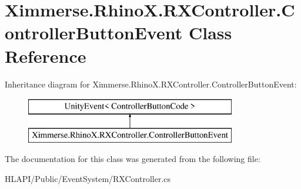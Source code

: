 \hypertarget{class_ximmerse_1_1_rhino_x_1_1_r_x_controller_1_1_controller_button_event}{}\section{Ximmerse.\+Rhino\+X.\+R\+X\+Controller.\+Controller\+Button\+Event Class Reference}
\label{class_ximmerse_1_1_rhino_x_1_1_r_x_controller_1_1_controller_button_event}
Inheritance diagram for Ximmerse.\+Rhino\+X.\+R\+X\+Controller.\+Controller\+Button\+Event\+:\begin{figure}[H]
\begin{center}
\leavevmode
\includegraphics[height=2.000000cm]{class_ximmerse_1_1_rhino_x_1_1_r_x_controller_1_1_controller_button_event}
\end{center}
\end{figure}


The documentation for this class was generated from the following file\+:\begin{DoxyCompactItemize}
\item 
H\+L\+A\+P\+I/\+Public/\+Event\+System/R\+X\+Controller.\+cs\end{DoxyCompactItemize}
